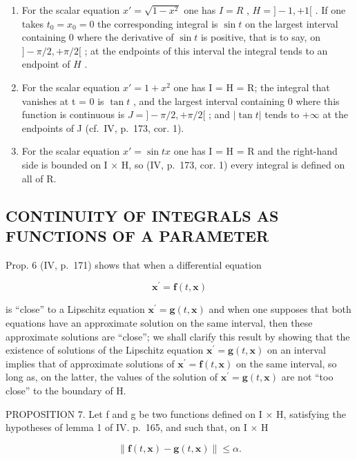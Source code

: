 \begin{enumerate}
\def\labelenumi{\arabic{enumi})}
\setcounter{enumi}{1}
\item
  For the scalar equation \(x' = \sqrt{1 - x^2}\) one has \(I = R\) , \(H = ] - 1, +1[\) . If one takes \(t_0 = x_0 = 0\) the corresponding integral is \(\sin t\) on the largest interval containing 0 where the derivative of \(\sin t\) is positive, that is to say, on \(] - \pi / 2, +\pi / 2[\) ; at the endpoints of this interval the integral tends to an endpoint of \(H\) .
\item
  For the scalar equation \(x' = 1 + x^{2}\) one has I = H = R; the integral that vanishes at t = 0 is \(\tan t\) , and the largest interval containing 0 where this function is continuous is \(J = ] - \pi/2, +\pi/2[\) ; and \(|\tan t|\) tends to \(+\infty\) at the endpoints of J (cf.~IV, p.~173, cor. 1).
\item
  For the scalar equation \(x' = \sin tx\) one has I = H = R and the right-hand side is bounded on I × H, so (IV, p.~173, cor. 1) every integral is defined on all of R.
\end{enumerate}

\subsection{CONTINUITY OF INTEGRALS AS FUNCTIONS OF A PARAMETER}

Prop. 6 (IV, p.~171) shows that when a differential equation

\[
\mathbf {x} ^ {\prime} = \mathbf {f} (t, \mathbf {x})
\]

is ``close'' to a Lipschitz equation \(\mathbf{x}^{\prime} = \mathbf{g}(t, \mathbf{x})\) and when one supposes that both equations have an approximate solution on the same interval, then these approximate solutions are ``close''; we shall clarify this result by showing that the existence of solutions of the Lipschitz equation \(\mathbf{x}^{\prime} = \mathbf{g}(t, \mathbf{x})\) on an interval implies that of approximate solutions of \(\mathbf{x}^{\prime} = \mathbf{f}(t, \mathbf{x})\) on the same interval, so long as, on the latter, the values of the solution of \(\mathbf{x}^{\prime} = \mathbf{g}(t, \mathbf{x})\) are not ``too close'' to the boundary of H.

PROPOSITION 7. Let f and g be two functions defined on I × H, satisfying the hypotheses of lemma 1 of IV. p.~165, and such that, on I × H

\[
\left\| \mathbf {f} (t, \mathbf {x}) - \mathbf {g} (t, \mathbf {x}) \right\| \leqslant \alpha .\tag{16}
\]

